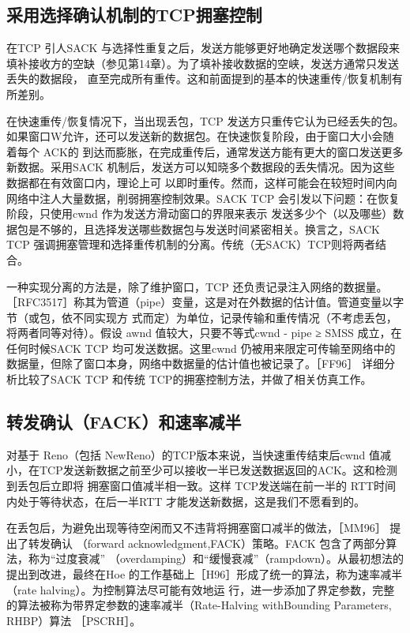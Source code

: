 \subsection{采用选择确认机制的TCP拥塞控制}
在TCP 引人SACK 与选择性重复之后，发送方能够更好地确定发送哪个数据段来填补接收方的空缺（参见第14章）。为了填补接收数据的空峡，发送方通常只发送丢失的数据段，
直至完成所有重传。这和前面提到的基本的快速重传/恢复机制有所差别。

在快速重传/恢复情况下，当出现丢包，TCP 发送方只重传它认为已经丢失的包。如果窗口W允许，还可以发送新的数据包。在快速恢复阶段，由于窗口大小会随着每个 ACK的
到达而膨胀，在完成重传后，通常发送方能有更大的窗口发送更多新数据。采用SACK 机制后，发送方可以知晓多个数据段的丢失情况。因为这些数据都在有效窗口内，理论上可
以即时重传。然而，这样可能会在较短时间内向网络中注人大量数据，削弱拥塞控制效果。SACK TCP 会引发以下问题：在恢复阶段，只使用cwnd 作为发送方滑动窗口的界限来表示
发送多少个（以及哪些）数据包是不够的，且选择发送哪些数据包与发送时间紧密相关。换言之，SACK TCP 强调拥塞管理和选择重传机制的分离。传统（无SACK）TCP则将两者结合。

一种实现分离的方法是，除了维护窗口，TCP 还负责记录注入网络的数据量。［RFC3517］称其为管道（pipe）变量，这是对在外数据的估计值。管道变量以字节（或包，依不同实现方
式而定）为单位，记录传输和重传情况（不考虑丢包，将两者同等对待）。假设 awnd 值较大，只要不等式cwnd - pipe ≥ SMSS 成立，在任何时候SACK TCP 均可发送数据。这里cwnd
仍被用来限定可传输至网络中的数据量，但除了窗口本身，网络中数据量的估计值也被记录了。［FF96］ 详细分析比较了SACK TCP 和传统 TCP的拥塞控制方法，并做了相关仿真工作。

\subsection{转发确认（FACK）和速率减半}
对基于 Reno（包括 NewReno）的TCP版本来说，当快速重传结束后cwnd 值减小，在TCP发送新数据之前至少可以接收一半已发送数据返回的ACK。这和检测到丢包后立即将
拥塞窗口值减半相一致。这样 TCP发送端在前一半的 RTT时间内处于等待状态，在后一半RTT 才能发送新数据，这是我们不愿看到的。

在丢包后，为避免出现等待空闲而又不违背将拥塞窗口减半的做法，［MM96］ 提出了转发确认 （forward acknowledgment,FACK）策略。FACK 包含了两部分算法，称为“过度衰减”
（overdamping）和“缓慢衰减”（rampdown）。从最初想法的提出到改进，最终在Hoe 的工作基础上［H96］形成了统一的算法，称为速率减半（rate halving）。为控制算法尽可能有效地运
行，进一步添加了界定参数，完整的算法被称为带界定参数的速率减半（Rate-Halving withBounding Parameters, RHBP）算法 ［PSCRH］。

